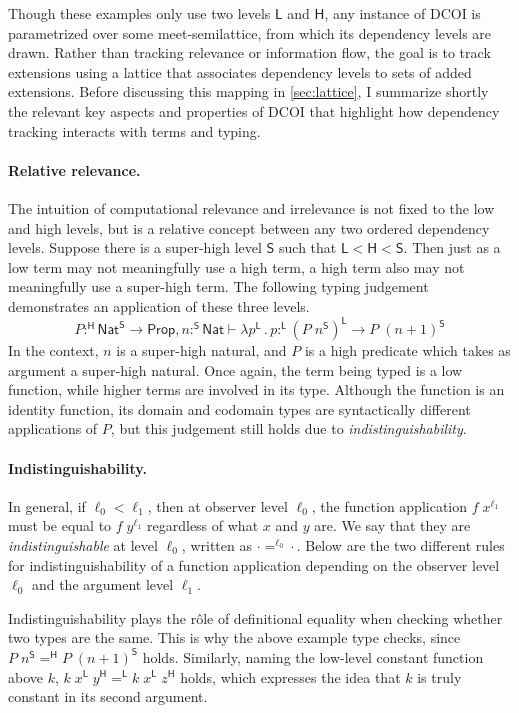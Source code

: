 \documentclass{article}
\newcommand{\kw}[1]{\mathsf{#1}}
\newcommand{\HH}{\mathsf{H}}
\newcommand{\LL}{\mathsf{L}}
\renewcommand{\SS}{\mathsf{S}}
\begin{document}
Though these examples only use two levels $\LL$ and $\HH$,
any instance of DCOI is parametrized over some meet-semilattice,
from which its dependency levels are drawn.
Rather than tracking relevance or information flow,
the goal is to track extensions
using a lattice that associates dependency levels to sets of added extensions.
Before discussing this mapping in \cref{sec:lattice},
I summarize shortly the relevant key aspects and properties of DCOI
that highlight how dependency tracking interacts with terms and typing.

\paragraph{Relative relevance.}
The intuition of computational relevance and irrelevance
is not fixed to the low and high levels,
but is a relative concept between any two ordered dependency levels.
Suppose there is a super-high level $\SS$ such that $\LL < \HH < \SS$.
Then just as a low term may not meaningfully use a high term,
a high term also may not meaningfully use a super-high term.
The following typing judgement demonstrates an application of these three levels.
$$P :^\HH \kw{Nat}^\SS \to \kw{Prop}, n :^\SS \kw{Nat} \vdash \lambda p^\LL \mathpunct{.} p :^\LL
  (P \; n^\SS)^\LL \to P \; (n + 1)^\SS$$
In the context, $n$ is a super-high natural,
and $P$ is a high predicate which takes as argument a super-high natural.
Once again, the term being typed is a low function,
while higher terms are involved in its type.
Although the function is an identity function,
its domain and codomain types are syntactically different applications of $P$,
but this judgement still holds due to \emph{indistinguishability}.

\paragraph{Indistinguishability.}
In general, if $\ell_0 < \ell_1$, then at observer level $\ell_0$,
the function application $f \; x^{\ell_1}$ must be equal
to $f \; y^{\ell_1}$ regardless of what $x$ and $y$ are.
We say that they are \emph{indistinguishable} at level $\ell_0$,
written as $\cdot =^{\ell_0} \cdot$.
Below are the two different rules for indistinguishability of a function application
depending on the observer level $\ell_0$ and the argument level $\ell_1$.
%
%
Indistinguishability plays the r\^ole of definitional equality
when checking whether two types are the same.
This is why the above example type checks,
since $P \; n^\SS =^\HH P \; (n + 1)^\SS$ holds.
Similarly, naming the low-level constant function above $k$,
$k \; x^\LL \; y^\HH =^\LL k \; x^\LL \; z^\HH$ holds,
which expresses the idea that $k$ is truly constant in its second argument.
\end{document}
